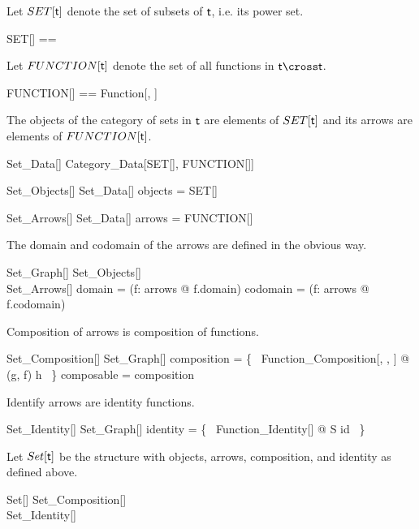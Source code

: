 \documentclass{amsart}
\begin{document}
Let $SET[\mathsf{t}]$ denote the set of subsets of $\mathsf{t}$, i.e. its power set.
\begin{zed}
	SET[\genT] == \power \genT
\end{zed}

Let $FUNCTION[\mathsf{t}]$ denote the set of all functions in $\genT \cross \genT$.
\begin{zed}
	FUNCTION[\genT] == Function[\genT, \genT]
\end{zed}

The objects of the category of sets in $\mathsf{t}$ are elements of $SET[\mathsf{t}]$
and its arrows are elements of $FUNCTION[\mathsf{t}]$.
\begin{schema}{Set\_Data}[\genT]
	Category\_Data[SET[\genT], FUNCTION[\genT]]
\end{schema}

\begin{schema}{Set\_Objects}[\genT]
	Set\_Data[\genT]
\where
	objects = SET[\genT]
\end{schema}

\begin{schema}{Set\_Arrows}[\genT]
	Set\_Data[\genT]
\where
	arrows = FUNCTION[\genT]
\end{schema}

The domain and codomain of the arrows are defined in the obvious way.
\begin{schema}{Set\_Graph}[\genT]
	Set\_Objects[\genT] \\
	Set\_Arrows[\genT]
\where
	domain = (\lambda f: arrows @ f.domain)
\also
	codomain = (\lambda f: arrows @ f.codomain)
\end{schema}

Composition of arrows is composition of functions.
\begin{schema}{Set\_Composition}[\genT]
	Set\_Graph[\genT]
\where
	composition = \{~ Function\_Composition[\genT, \genT, \genT] @ (g, f) \mapsto h ~\}
\also
	composable = \dom composition
\end{schema}

Identify arrows are identity functions.
\begin{schema}{Set\_Identity}[\genT]
	Set\_Graph[\genT]
\where
	identity = \{~ Function\_Identity[\genT] @ S \mapsto id ~\}
\end{schema}

Let $Set[\mathsf{t}]$ be the structure with objects, arrows, composition, and identity as defined above.
\begin{schema}{Set}[\genT]
	Set\_Composition[\genT] \\
	Set\_Identity[\genT]
\end{schema}
\end{document}
